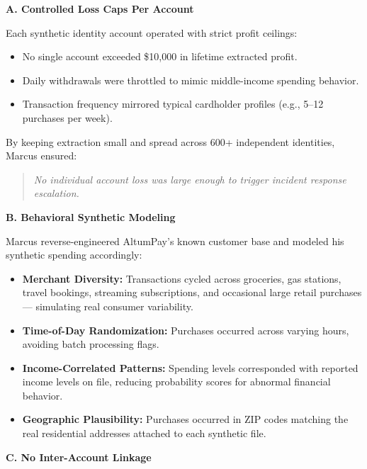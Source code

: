 \textbf{A. Controlled Loss Caps Per Account}

Each synthetic identity account operated with strict profit ceilings:

\begin{itemize}
    \item No single account exceeded \$10,000 in lifetime extracted profit.
    \item Daily withdrawals were throttled to mimic middle-income spending behavior.
    \item Transaction frequency mirrored typical cardholder profiles (e.g., 5--12 purchases per week).
\end{itemize}

By keeping extraction small and spread across 600+ independent identities, Marcus ensured:

\begin{quote}
    \textit{No individual account loss was large enough to trigger incident response escalation.}
\end{quote}

\medskip

\textbf{B. Behavioral Synthetic Modeling}

Marcus reverse-engineered AltumPay’s known customer base and modeled his synthetic spending accordingly:

\begin{itemize}
    \item \textbf{Merchant Diversity:}  
    Transactions cycled across groceries, gas stations, travel bookings, streaming subscriptions, and occasional large retail purchases --- simulating real consumer variability.

    \item \textbf{Time-of-Day Randomization:}  
    Purchases occurred across varying hours, avoiding batch processing flags.

    \item \textbf{Income-Correlated Patterns:}  
    Spending levels corresponded with reported income levels on file, reducing probability scores for abnormal financial behavior.

    \item \textbf{Geographic Plausibility:}  
    Purchases occurred in ZIP codes matching the real residential addresses attached to each synthetic file.
\end{itemize}

\medskip

\textbf{C. No Inter-Account Linkage}

